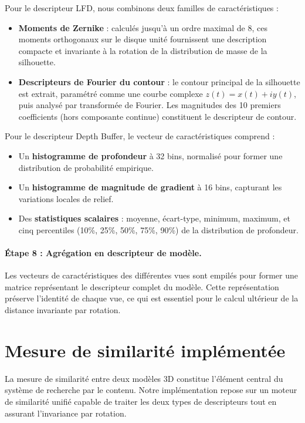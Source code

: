 \documentclass[11pt,a4paper,oneside]{report}
\begin{document}
Pour le descripteur LFD, nous combinons deux familles de caractéristiques :
\begin{itemize}
    \item \textbf{Moments de Zernike} : calculés jusqu'à un ordre maximal de 8, ces moments orthogonaux sur le disque unité fournissent une description compacte et invariante à la rotation de la distribution de masse de la silhouette.
    \item \textbf{Descripteurs de Fourier du contour} : le contour principal de la silhouette est extrait, paramétré comme une courbe complexe $z(t) = x(t) + iy(t)$, puis analysé par transformée de Fourier. Les magnitudes des 10 premiers coefficients (hors composante continue) constituent le descripteur de contour.
\end{itemize}

Pour le descripteur Depth Buffer, le vecteur de caractéristiques comprend :
\begin{itemize}
    \item Un \textbf{histogramme de profondeur} à 32 bins, normalisé pour former une distribution de probabilité empirique.
    \item Un \textbf{histogramme de magnitude de gradient} à 16 bins, capturant les variations locales de relief.
    \item Des \textbf{statistiques scalaires} : moyenne, écart-type, minimum, maximum, et cinq percentiles (10\%, 25\%, 50\%, 75\%, 90\%) de la distribution de profondeur.
\end{itemize}

\paragraph{Étape 8 : Agrégation en descripteur de modèle.} Les vecteurs de caractéristiques des différentes vues sont empilés pour former une matrice représentant le descripteur complet du modèle. Cette représentation préserve l'identité de chaque vue, ce qui est essentiel pour le calcul ultérieur de la distance invariante par rotation.

\section{Mesure de similarité implémentée}

La mesure de similarité entre deux modèles 3D constitue l'élément central du système de recherche par le contenu. Notre implémentation repose sur un moteur de similarité unifié capable de traiter les deux types de descripteurs tout en assurant l'invariance par rotation.
\end{document}
